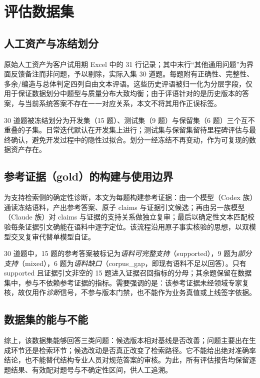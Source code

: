 \documentclass[11pt,a4paper,fontset=fandol]{ctexart}
\begin{document}
\section{评估数据集}
\label{sec:dataset}

\subsection{人工资产与冻结划分}

原始人工资产为客户试用期 Excel 中的 31 行记录；其中末行``其他通用问题''为界面反馈备注而非问题，予以剔除，实际入集 30 道题。每题附有正确性、完整性、多余/编造与总体判定四列自由文本评语。这些历史评语被归一化为分层字段，仅用于保证数据划分中题型与质量分布大致均衡；由于评语针对的是历史版本的答案，与当前系统答案不存在一一对应关系，本文不将其用作正误标签。

30 道题被冻结划分为开发集（15 题）、测试集（9 题）与保留集（6 题）三个互不重叠的子集。日常迭代默认在开发集上进行；测试集与保留集留待里程碑评估与最终确认，避免开发过程中的隐性过拟合。划分一经冻结不再变动，作为可复现的数据资产存在。

\subsection{参考证据（gold）的构建与使用边界}

为支持检索侧的确定性诊断，本文为每题构建参考证据：由一个模型（Codex 族）通读冻结语料，产出参考答案、原子 claims 与证据引文候选；再由另一族模型（Claude 族）对 claims 与证据的支持关系做独立复审；最后以确定性文本匹配校验每条证据引文确能在语料中逐字定位。该流程沿用原子事实核验的思想\cite{factscore,ragchecker}，以双模型交叉复审代替单模型自证。

30 道题中，15 题的参考答案被标记为\emph{语料可完整支持}（supported），9 题为\emph{部分支持}（mixed），6 题为\emph{语料缺口}（corpus\_gap，即现有语料不足以回答）。只有 supported 且证据引文非空的 15 题进入证据召回指标的分母；其余题保留在数据集中，参与不依赖参考证据的指标。需要强调的是：该参考证据未经领域专家复核，故仅用作\emph{诊断}信号，不参与版本门禁，也不能作为业务真值或上线签字依据。

\subsection{数据集的能与不能}

综上，该数据集能够回答三类问题：候选版本相对基线是否改善；问题主要出在生成环节还是检索环节；候选改动是否真正改变了检索路径。它不能给出绝对准确率结论，也不能替代结构专业人员对规范答案的审核。为此，所有评估报告均保留逐题结果、有效配对题号与不确定性区间，供人工追溯。
\end{document}
